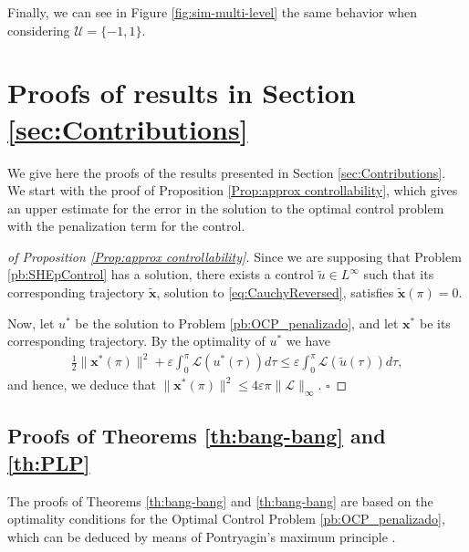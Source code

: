 \documentclass[twocolumn]{autart}    %
\begin{document}
Finally, we can see in Figure \ref{fig:sim-multi-level} the same behavior when considering  $\mathcal{U} = \{-1,1\}$.
 

\section{Proofs of results in Section \ref{sec:Contributions}}\label{sec:Proof}

We give here the proofs of the results presented in Section \ref{sec:Contributions}. We start with the proof of Proposition \ref{Prop:approx controllability}, which gives an upper estimate for the error in the solution to the optimal control problem with the penalization term for the control. 

\bigskip

\begin{proof}[of Proposition \ref{Prop:approx controllability}]
Since we are supposing that Problem \ref{pb:SHEpControl} has a solution, there exists a control $\tilde{u}\in L^\infty$ such that its corresponding trajectory $\tilde{\bm{x}}$, solution to \eqref{eq:CauchyReversed}, satisfies $\tilde{\bm{x}}(\pi) = 0$. 

Now, let $u^\ast$ be the solution to Problem \ref{pb:OCP_penalizado}, and let $\bm{x}^\ast$ be its corresponding trajectory. By the optimality of $u^\ast$ we have
\begin{align*}
	\frac{1}{2} \| \bm{x}^\ast(\pi)\|^2 +\varepsilon \int_0^\pi \mathcal{L}(u^\ast(\tau))d\tau \leq \varepsilon \int_0^\pi \mathcal{L}(\tilde{u}(\tau))d\tau,
\end{align*}
and hence, we deduce that $\| \bm{x}^\ast (\pi)\|^2 \leq 4 \varepsilon \pi \| \mathcal{L}\|_\infty.$ \hfill $\square$
\end{proof}


\subsection{Proofs of Theorems \ref{th:bang-bang} and \ref{th:PLP}}

The proofs of Theorems \ref{th:bang-bang} and \ref{th:bang-bang} are based on the optimality conditions for the Optimal Control Problem \ref{pb:OCP_penalizado}, which can be deduced by means of Pontryagin's maximum principle \cite[Chapter~2.7]{bryson1975applied}.
\end{document}
